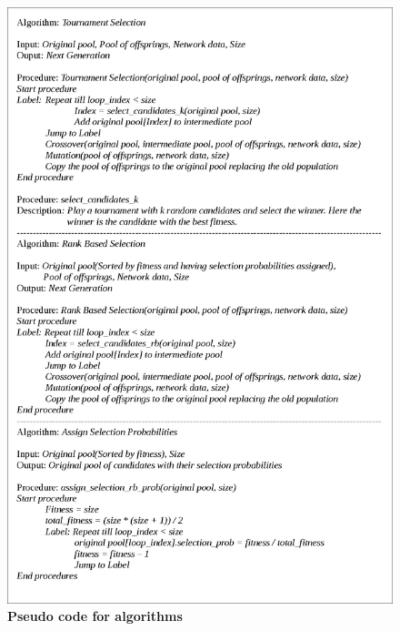 \documentclass[a4paper, 12pt]{article}
\begin{document}
\begin{figure}[htbp]
\hspace*{0.1in}
\includegraphics[scale=0.9]{./diagram1.eps}
\caption{\textbf{Pseudo code for algorithms}}
\label{fig 2}
\end{figure}
\end{document}
